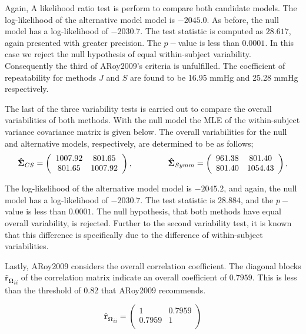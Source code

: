 \documentclass[12pt, a4paper]{report}
\theoremstyle{plain}
\theoremstyle{definition}
\theoremstyle{remark}
\begin{document}
	Again, A likelihood ratio test is perform to compare both candidate models. The log-likelihood of the alternative model model is $-2045.0$. As before, the null model has a log-likelihood of $-2030.7$. The test statistic is computed as $28.617$, again presented with greater precision. The $p-$value is less than $0.0001$. In this case we reject the null hypothesis of equal within-subject variability. Consequently the third of ARoy2009's criteria is unfulfilled.
	The coefficient of repeatability for methods $J$ and $S$ are found to be 16.95 mmHg and 25.28 mmHg respectively.
	
	The last of the three variability tests is carried out to compare the overall variabilities of both methods.
	With the null model the MLE of the within-subject variance covariance matrix is given below. The overall variabilities for the null and alternative models, respectively, are determined to be as follows;
	\[
	\boldsymbol{\hat{\Sigma}}_{CS} = \left( \begin{array}{cc}
	1007.92  & 801.65  \\
	801.65  & 1007.92  \\
	\end{array}\right),
	\hspace{1.5cm}
	\boldsymbol{\hat{\Sigma}}_{Symm} = \left( \begin{array}{cc}
	961.38 & 801.40  \\
	801.40 & 1054.43  \\
	\end{array}\right),
	\]
	
	The log-likelihood of the alternative model model is $-2045.2$, and again, the null model has a log-likelihood of $-2030.7$. The test statistic is $28.884$, and the $p-$value is less than $0.0001$. The null hypothesis, that both methods have equal overall variability, is rejected. Further to the second variability test, it is known that this difference is specifically due to the difference of within-subject variabilities.
	
	Lastly, ARoy2009 considers the overall correlation coefficient. The diagonal blocks $\boldsymbol{\hat{r}_{\Omega}}_{ii}$ of the correlation matrix indicate an overall coefficient of $0.7959$. This is less than the threshold of 0.82 that ARoy2009 recommends.
	
	\[
	\boldsymbol{\hat{r}_{\Omega}}_{ii} = \left( \begin{array}{cc}
	1  & 0.7959  \\
	0.7959  & 1  \\
	\end{array}\right)
	\]
	
\end{document}
